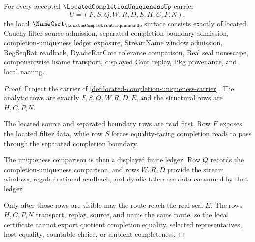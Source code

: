 \begin{theorem}
\label{thm:located-completion-uniqueness-namecert-obligations}
For every accepted $\LocatedCompletionUniquenessUp$ carrier
$$
U=(F,S,Q,W,R,D,E,H,C,P,N),
$$
the local $\NameCert_{\LocatedCompletionUniquenessUp}$ surface consists exactly of located Cauchy-filter source admission, separated-completion boundary admission, completion-uniqueness ledger exposure, StreamName window admission, RegSeqRat readback, DyadicRatCore tolerance comparison, Real seal nonescape, componentwise hsame transport, displayed Cont replay, Pkg provenance, and local naming.
\end{theorem}
\begin{proof}
Project the carrier of \autoref{def:located-completion-uniqueness-carrier}. The analytic rows are exactly $F,S,Q,W,R,D,E$, and the structural rows are $H,C,P,N$.

The located source and separated boundary rows are read first. Row $F$ exposes the located filter data, while row $S$ forces equality-facing completion reads to pass through the separated completion boundary.

The uniqueness comparison is then a displayed finite ledger. Row $Q$ records the completion-uniqueness comparison, and rows $W,R,D$ provide the stream windows, regular rational readback, and dyadic tolerance data consumed by that ledger.

Only after those rows are visible may the route reach the real seal $E$. The rows $H,C,P,N$ transport, replay, source, and name the same route, so the local certificate cannot export quotient completion equality, selected representatives, host equality, countable choice, or ambient completeness.
\end{proof}

